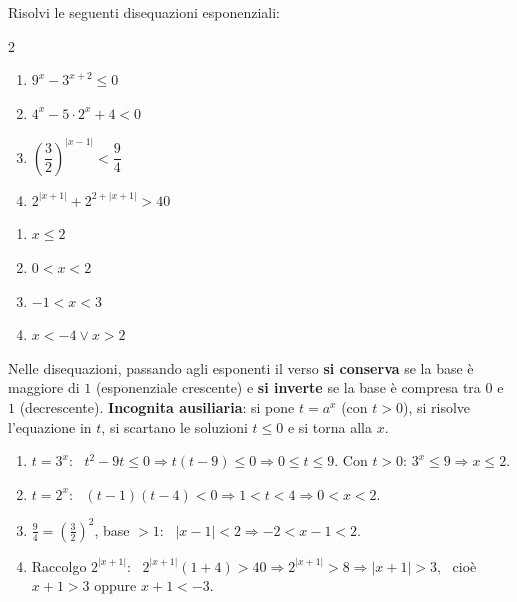 
\begin{question}[ID=5.5, subtitle={Disequazioni con incognita ausiliaria e valore assoluto}, difficulty=difficile, tags={disequazioni, esponenziali, sostituzione, valore assoluto}]
Risolvi le seguenti disequazioni esponenziali:
\begin{center}\begin{minipage}{0.92\linewidth}
\begin{multicols}{2}
\begin{enumerate}[leftmargin=3.2cm]
\item $9^{x} - 3^{x+2} \leq 0$
\item $4^{x} - 5 \cdot 2^{x} + 4 < 0$
\item $\left(\dfrac{3}{2}\right)^{|x-1|} < \dfrac{9}{4}$
\item $2^{|x+1|} + 2^{2+|x+1|} > 40$
\end{enumerate}
\end{multicols}
\end{minipage}\end{center}
\begin{solution}
\begin{enumerate}
    \item $x\leq2$
    \item $0<x<2$
    \item $-1<x<3$
    \item $x<-4\vee x>2$
\end{enumerate}
\end{solution}
\begin{explanation}
Nelle disequazioni, passando agli esponenti il verso \textbf{si conserva} se la base è maggiore di $1$ (esponenziale crescente) e \textbf{si inverte} se la base è compresa tra $0$ e $1$ (decrescente).
\textbf{Incognita ausiliaria}: si pone $t=a^x$ (con $t>0$), si risolve l'equazione in $t$, si scartano le soluzioni $t\leq0$ e si torna alla $x$.
\begin{enumerate}
    \item $t=3^x$: \ $t^2-9t\leq0 \Rightarrow t(t-9)\leq0 \Rightarrow 0\leq t\leq9$. Con $t>0$: $3^x\leq9 \Rightarrow x\leq2$.
    \item $t=2^x$: \ $(t-1)(t-4)<0 \Rightarrow 1<t<4 \Rightarrow 0<x<2$.
    \item $\tfrac94=\left(\tfrac32\right)^2$, base $>1$: \ $|x-1|<2 \Rightarrow -2<x-1<2$.
    \item Raccolgo $2^{|x+1|}$: \ $2^{|x+1|}(1+4)>40 \Rightarrow 2^{|x+1|}>8 \Rightarrow |x+1|>3$, \ cioè $x+1>3$ oppure $x+1<-3$.
\end{enumerate}
\end{explanation}
\end{question}

